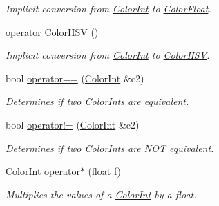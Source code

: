 \begin{DoxyCompactItemize}
\begin{DoxyCompactList}\small\item\em Implicit conversion from \hyperlink{structtsgl_1_1_color_int}{Color\+Int} to \hyperlink{structtsgl_1_1_color_float}{Color\+Float}. \end{DoxyCompactList}\item 
\hyperlink{structtsgl_1_1_color_int_acbd82ad2c6388389aa3474f042a25353}{operator Color\+H\+S\+V} ()
\begin{DoxyCompactList}\small\item\em Implicit conversion from \hyperlink{structtsgl_1_1_color_int}{Color\+Int} to \hyperlink{structtsgl_1_1_color_h_s_v}{Color\+H\+S\+V}. \end{DoxyCompactList}\item 
bool \hyperlink{structtsgl_1_1_color_int_a7d6282c79f42d4ba9a70c4475b8170c2}{operator==} (\hyperlink{structtsgl_1_1_color_int}{Color\+Int} \&c2)
\begin{DoxyCompactList}\small\item\em Determines if two Color\+Ints are equivalent. \end{DoxyCompactList}\item 
bool \hyperlink{structtsgl_1_1_color_int_af83865a1b76eb8c0a5e0fe4bc34fab2d}{operator!=} (\hyperlink{structtsgl_1_1_color_int}{Color\+Int} \&c2)
\begin{DoxyCompactList}\small\item\em Determines if two Color\+Ints are {\itshape N\+O\+T} equivalent. \end{DoxyCompactList}\item 
\hyperlink{structtsgl_1_1_color_int}{Color\+Int} \hyperlink{structtsgl_1_1_color_int_aa6dbbe3d7d1653e16eadc1843a6c3be1}{operator$\ast$} (float f)
\begin{DoxyCompactList}\small\item\em Multiplies the values of a \hyperlink{structtsgl_1_1_color_int}{Color\+Int} by a float. \end{DoxyCompactList}\end{DoxyCompactItemize}
